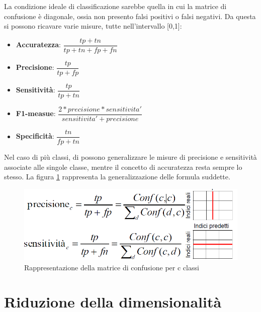 La condizione ideale di classificazione sarebbe quella in cui la matrice di confusione è diagonale, ossia non presento falsi positivi o falsi negativi. Da questa si possono ricavare varie misure, tutte nell'intervallo [0,1]:
\begin{itemize}
	\item \textbf{Accuratezza}: $\dfrac{tp+tn}{tp+tn+fp+fn}$
	\item \textbf{Precisione}: $\dfrac{tp}{tp+fp}$
	\item \textbf{Sensitività}: $\dfrac{tp}{tp+tn}$
	\item \textbf{F1-measue}: $\dfrac{2*precisione*sensitivita' }{sensitivita' + precisione}$
	\item \textbf{Specificità}: $\dfrac{tn}{fp+tn}$
\end{itemize}
Nel caso di più classi, di possono generalizzare le misure di precisione e sensitività associate alle singole classe, mentre il concetto di accuratezza resta sempre lo stesso. La figura \ref{immagine_matrice_confusione_cclassi} rappresenta la generalizzazione delle formula suddette.
\begin{figure}[h!]
	\centering
	\includegraphics[scale=0.5]{images/matrice_confusione_cclassi.png}
	\caption{Rappresentazione della matrice di confusione per c classi}
	\label{immagine_matrice_confusione_cclassi}
\end{figure}

\section{Riduzione della dimensionalità}
